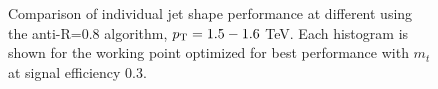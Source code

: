 \begin{figure}
\begin{center}
\caption{Comparison of individual jet shape performance at different \pt using the anti-\kT R=0.8 algorithm, $p_{\rm T}=1.5-1.6$ TeV. Each histogram is shown for the working point optimized for best performance with $m_t$ at signal efficiency 0.3.}
\label{fig:topmass_histogram_HEP_JH}
\end{center}
\end{figure}

